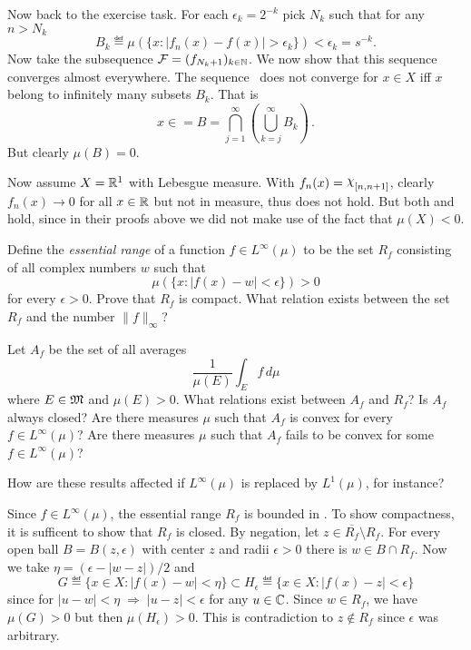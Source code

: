 \begin{enumerate}
\begin{itemize}
 Now back to the exercise task. For each \(\epsilon_k = 2^{-k}\)
 pick \(N_k\) such that for any \(n>N_k\)
  \begin{equation*}
   B_k \eqdef \mu(\{x: |f_n(x) - f(x)| > \epsilon_k\}) < \epsilon_k = s^{-k}.
  \end{equation*}
 Now take the subsequence \(\mathcal{F} = (f_{N_k + 1})_{k\in\mathbb{N}}\).
 We now show that this sequence converges almost everywhere.
 The sequence \calF\ does not converge for \(x\in X\)
 iff $x$ belong to infinitely many subsets \(B_k\).
 That is
 \begin{equation*}
  x\in  = B = \bigcap_{j=1}^\infty \left( \bigcup_{k=j}^\infty B_k \right)\,.
 \end{equation*}
 But clearly \(\mu(B) = 0\).
\end{itemize}

Now assume \(X=\mathbb{R}^1\) with Lebesgue measure.
With \(f_n(x) = \chhi_{[n,n+1]}\), clearly \(f_n(x)\to 0\) for all \(x\in\mathbb{R}\)
but not in measure, thus  does not hold.
But both  and  hold, since in their proofs above
we did not make use of the fact that \(\mu(X)<0\).

\begin{excopy}
Define the \emph{essential range} of a function \(f\in L^\infty(\mu)\)
to be the set \(R_f\) consisting of all complex numbers $w$ such that
\begin{equation*}
 \mu(\{x: |f(x) - w | < \epsilon\}) > 0
\end{equation*}
for every \(\epsilon > 0\). Prove that \(R_f\) is compact.
What relation exists between the set \(R_f\) and the number \(\|f\|_\infty\)?

Let \(A_f\) be the set of all averages
\begin{equation*}
 \frac{1}{\mu(E)}\int_E f\,d\mu
\end{equation*}
where \(E\in\mathfrak{M}\) and \(\mu(E)>0\).
What relations exist between \(A_f\) and \(R_f\)?
Is \(A_f\) always closed?
Are there measures \(\mu\) such that \(A_f\) is convex
for every \(f\in L^\infty(\mu)\)?
Are there measures \(\mu\) such that \(A_f\) fails to be convex for
some \(f\in L^\infty(\mu)\)?

How are these results affected if \(L^\infty(\mu)\) is replaced
by \(L^1(\mu)\), for instance?
\end{excopy}

Since \(f\in L^\infty(\mu)\), the essential range \(R_f\) is bounded in \C.
To show compactness, it is sufficent to show that \(R_f\) is closed.
By negation, let \(z\in \overline{R_f} \setminus R_f\).
For every open ball \(B = B(z,\epsilon)\)
with center $z$ and radii \(\epsilon > 0\)
there is \(w\in B\cap R_f\).
Now we take \(\eta = (\epsilon - |w-z|)/2\) and
\begin{equation*}
 G \eqdef \{x\in X: |f(x) - w| < \eta\} \subset
 H_\epsilon \eqdef \{x\in X: |f(x) - z| < \epsilon\}
\end{equation*}
since for \(|u-w|<\eta\;\Rightarrow\; |u - z|<\epsilon\) for any \(u\in\mathbb{C}\).
Since \(w\in R_f\), we have \(\mu(G) > 0\) but then \(\mu(H_\epsilon) > 0\).
This is contradiction to \(z\notin R_f\) since \(\epsilon\) was arbitrary.


\end{enumerate}
